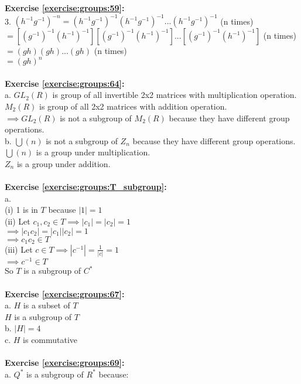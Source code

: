 \textbf{Exercise \ref{exercise:groups:59}:}\\
3. $(h^{-1}g^{-1})^{-n}=(h^{-1}g^{-1})^{-1}(h^{-1}g^{-1})^{-1}...(h^{-1}g^{-1})^{-1}$ (n times)\\
$=[(g^{-1})^{-1}(h^{-1})^{-1}][(g^{-1})^{-1}(h^{-1})^{-1}]...[(g^{-1})^{-1}(h^{-1})^{-1}]$ (n times)\\
$=(gh)(gh)...(gh)$ (n times)\\
$=(gh)^n$\\
\\
\textbf{Exercise \ref{exercise:groups:64}:}\\
a. $GL_2(R)$ is group of all invertible 2x2 matrices with multiplication operation.\\
$M_2(R)$ is group of all 2x2 matrices with addition operation.\\
$\implies GL_2(R)$ is not a subgroup of $M_2(R)$ because they have different group operations.\\
b. $\bigcup(n)$ is not a subgroup of $Z_n$ because they have different group operations.\\
$\bigcup(n)$ is a group under multiplication.\\
$Z_n$ is a group under addition.\\
\\
\textbf{Exercise \ref{exercise:groups:T_subgroup}:}\\
a.\\
(i) 1 is in $T$ because $|1|=1$\\
(ii) Let $c_1,c_2\in T\implies |c_1|=|c_2|=1$\\
$\implies |c_1c_2|=|c_1||c_2|=1$\\
$\implies c_1c_2\in T$\\
(iii) Let $c\in T \implies |c^{-1}|=\displaystyle\frac{1}{|c|}=1$\\
$\implies c^{-1}\in T$\\
So $T$ is a subgroup of $C^*$\\
\\
\textbf{Exercise \ref{exercise:groups:67}:}\\
a. $H$ is a subset of $T$\\
$H$ is a subgroup of $T$\\
b. $|H|=4$\\
c. $H$ is commutative\\
\\
\textbf{Exercise \ref{exercise:groups:69}:}\\
a. $Q^*$ is a subgroup of $R^*$ because:\\
